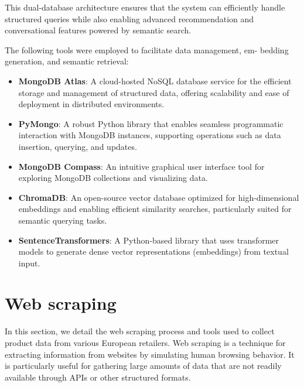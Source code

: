 This dual-database architecture ensures that the system can efficiently
handle structured queries while also enabling advanced recommendation
and conversational features powered by semantic search.

\par The following tools were employed to facilitate data management, em-
bedding generation, and semantic retrieval:

\begin{itemize}[label=\textbf{-}]
    \item \textbf{MongoDB Atlas}: A cloud-hosted NoSQL database service for the efficient storage and management of structured data, offering scalability and ease of deployment in distributed environments.
    \item \textbf{PyMongo}: A robust Python library that enables seamless programmatic interaction with MongoDB instances, supporting operations such as data insertion, querying, and updates.
    \item \textbf{MongoDB Compass}: An intuitive graphical user interface tool for exploring MongoDB collections and visualizing data.
    \item \textbf{ChromaDB}: An open-source vector database optimized for high-dimensional embeddings and enabling efficient similarity searches, particularly suited for semantic querying tasks.
    \item \textbf{SentenceTransformers}: A Python-based library that uses transformer models to generate dense vector representations (embeddings) from textual input.
\end{itemize}


\section{Web scraping}
\par In this section, we detail the web scraping process and tools used to
collect product data from various European retailers. Web scraping is a
technique for extracting information from websites by simulating human
browsing behavior. It is particularly useful for gathering large amounts
of data that are not readily available through APIs or other structured
formats.

